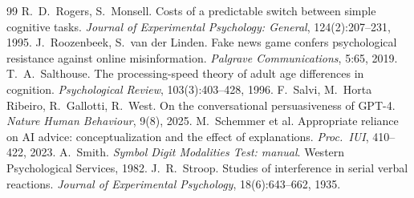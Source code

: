 \documentclass[11pt,a4paper]{article}
\begin{document}
\begin{thebibliography}{99}
 R.~D.~Rogers, S.~Monsell. Costs of a predictable switch between simple cognitive tasks. \emph{Journal of Experimental Psychology: General}, 124(2):207--231, 1995.
 J.~Roozenbeek, S.~van der Linden. Fake news game confers psychological resistance against online misinformation. \emph{Palgrave Communications}, 5:65, 2019.
 T.~A.~Salthouse. The processing-speed theory of adult age differences in cognition. \emph{Psychological Review}, 103(3):403--428, 1996.
 F.~Salvi, M.~Horta Ribeiro, R.~Gallotti, R.~West. On the conversational persuasiveness of GPT-4. \emph{Nature Human Behaviour}, 9(8), 2025.
 M.~Schemmer et al. Appropriate reliance on AI advice: conceptualization and the effect of explanations. \emph{Proc.\ IUI}, 410--422, 2023.
 A.~Smith. \emph{Symbol Digit Modalities Test: manual}. Western Psychological Services, 1982.
 J.~R.~Stroop. Studies of interference in serial verbal reactions. \emph{Journal of Experimental Psychology}, 18(6):643--662, 1935.
\end{thebibliography}
\end{document}
